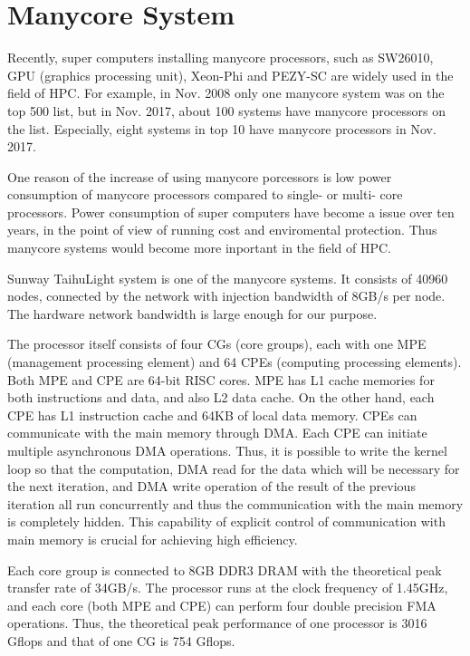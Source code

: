 \documentclass[]{pasj01}
\begin{document}
\section{Manycore System}
\label{sec:TaihuLight}

Recently, super computers installing manycore processors, such as
SW26010, GPU (graphics processing unit), Xeon-Phi and PEZY-SC are
widely used in the field of HPC.  For example, in Nov. 2008 only one
manycore system was on the top 500 list, but in Nov. 2017, about 100
systems have manycore processors on the list. Especially, eight
systems in top 10 have manycore processors in Nov. 2017.

One reason of the increase of using manycore porcessors is low power
consumption of manycore processors compared to single- or multi- core
processors. Power consumption of super computers have become a issue
over ten years, in the point of view of running cost and enviromental
protection. Thus manycore systems would become more inportant in the
field of HPC.

Sunway TaihuLight system is one of the manycore systems. It consists
of 40960 nodes, connected by the network with injection bandwidth of
8GB/s per node. The hardware network bandwidth is large enough for our
purpose.

The processor itself consists of four CGs (core groups), each with one
MPE (management processing element) and 64 CPEs (computing processing
elements). Both MPE and CPE are 64-bit RISC cores. MPE has L1 cache
memories for both instructions and data, and also L2 data cache. On
the other hand, each CPE has L1 instruction cache and 64KB of local
data memory. CPEs can communicate with the main memory through DMA.
Each CPE can initiate multiple asynchronous DMA operations. Thus, it
is possible to write the kernel loop so that the computation, DMA read
for the data which will be necessary for the next iteration, and DMA
write operation of the result of the previous iteration all run
concurrently and thus the communication with the main memory is
completely hidden. This capability of explicit control of
communication with main memory is crucial for achieving high
efficiency.

Each core group is connected to 8GB DDR3 DRAM with the theoretical
peak transfer rate of 34GB/s. The processor runs at the clock
frequency of 1.45GHz, and each core (both MPE and CPE) can perform
four double precision FMA operations. Thus, the theoretical peak
performance of one processor is 3016 Gflops and that of one CG is 754
Gflops.
\end{document}
